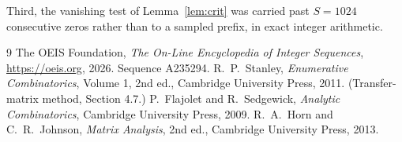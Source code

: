\documentclass[11pt,a4paper]{article}
\theoremstyle{plain}
\theoremstyle{definition}
\begin{document}
Third, the vanishing test of Lemma~\ref{lem:crit} was carried past $S=1024$ consecutive
zeros rather than to a sampled prefix, in exact integer arithmetic.

\begin{thebibliography}{9}
 The OEIS Foundation, \emph{The On-Line Encyclopedia of Integer
Sequences}, \url{https://oeis.org}, 2026. Sequence A235294.
 R.~P.~Stanley, \emph{Enumerative Combinatorics}, Volume 1, 2nd ed.,
Cambridge University Press, 2011. (Transfer-matrix method, Section 4.7.)
 P.~Flajolet and R.~Sedgewick, \emph{Analytic Combinatorics}, Cambridge
University Press, 2009.
 R.~A.~Horn and C.~R.~Johnson, \emph{Matrix Analysis}, 2nd ed., Cambridge
University Press, 2013.
\end{thebibliography}
\end{document}
